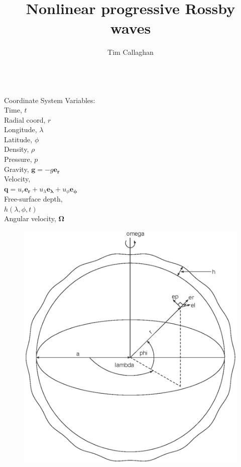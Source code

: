 \documentclass[pdf,distiller]{prosper}
\title{Nonlinear progressive Rossby waves}
\author{Tim Callaghan\\
\institution{School of Mathematics and Physics}\\
\institution{University of Tasmania}}
\newcommand{\er}{\ensuremath{\boldsymbol{e_r}}}
\newcommand{\elam}{\ensuremath{\boldsymbol{e_{\lambda}}}}
\newcommand{\ephi}{\ensuremath{\boldsymbol{e_{\phi}}}}
\begin{document}
\maketitle



\begin{slide}{Coordinate System}
{Variables:\\
Time, $t$\\
Radial coord, $r$\\
Longitude, $\lambda$\\
Latitude, $\phi$\\
Density, $\rho$\\
Pressure, $p$\\
Gravity, $\boldsymbol{g}=-g\boldsymbol{e_r}$\\
Velocity,\\
$\boldsymbol{q} = u_r \er + u_{\lambda} \elam + u_{\phi} \ephi$\\
Free-surface depth,\\
$h(\lambda,\phi,t)$\\
Angular velocity, $\boldsymbol{\Omega}$
}
{\begin{figure}[htbp]
	\centering
  \includegraphics[scale=0.42]{fig1.eps}
  \label{fig:1}
\end{figure}
}
\end{slide}
\end{document}
